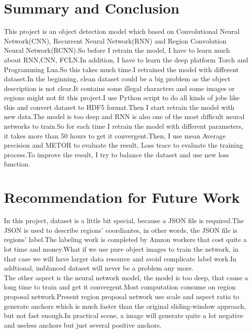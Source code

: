 \documentclass[12pt,a4paper]{report}
\begin{document}
\section{Summary and Conclusion}
This project is an object detection model which based on Convolutional Neural Network(CNN), Recurrent Neural Network(RNN) and Region Convolution Neural Network(RCNN).So before I retrain the model, I have to learn much about RNN,CNN, FCLN.In addition, I have to learn the deep platform Torch and Programming Lua.So this takes much time.I retrained the model with different dataset.In the beginning, clean dataset could be a big problem as the object description is not clear.It contains some illegal characters and some images or regions might not fit this project.I use Python script to do all kinds of jobs like this and convert dataset to HDF5 format.Then I start retrain the model with new data.The model is too deep and RNN is also one of the most difficult neural networks to train.So for each time I retrain the model with different parameters, it takes more than 50 hours to get it convergent.Then, I use mean Average precision and METOR to evaluate the result, Loss trace to evaluate the training process.To improve the result, I try to balance the dataset and use new loss function.
\newpage
\section{Recommendation for Future Work}
In this project, dataset is a little bit special, because a JSON file is required.The JSON is used to describe regions' coordiantes, in other words, the JSON file is regions' label.The labeling work is completed by Amzon workers that cost quite a lot time and money.What if we use pure object images to train the network, in that case we will have larger data resource and avoid complicate label work.In addtional, imblanced dataset will never be a problem any more.\\
The other aspect is the neural network model, the model is too deep,  that cause a long time to train and get it convergent.Most computation consume on region proposal network.Present region proposal network use scale
and aspect ratio to generate anchors which is much faster than the original sliding-window approach, but not fast enough.In practical scene, a image will generate quite a lot negative and useless anchors but just several positive anchors.\cite{focalloss}

\newpage


\printbibliography

\newpage
\end{document}
